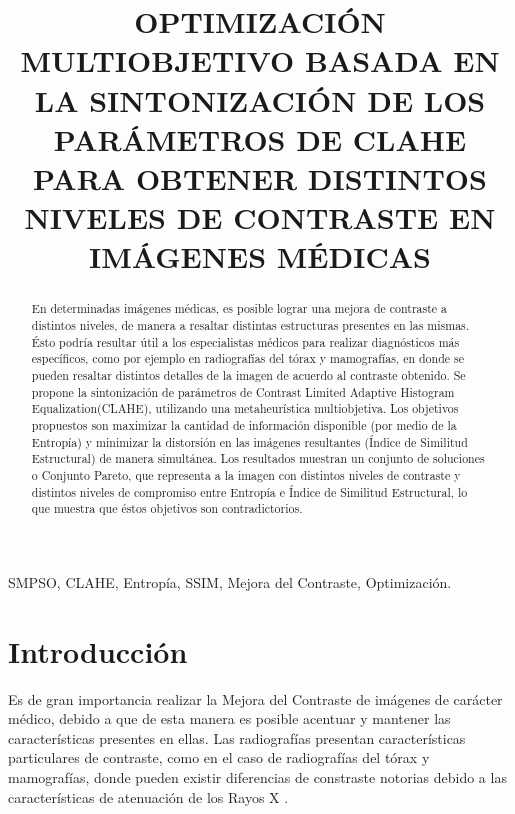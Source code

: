 \documentclass[spanish,twocolumn]{article}
\title{OPTIMIZACIÓN MULTIOBJETIVO BASADA EN LA SINTONIZACIÓN DE LOS PARÁMETROS DE CLAHE PARA OBTENER DISTINTOS NIVELES DE CONTRASTE EN IMÁGENES MÉDICAS}
\begin{document}
%
\maketitle
%
\begin{abstract}
En determinadas imágenes médicas, es posible lograr una mejora de contraste a distintos niveles, de manera a resaltar distintas estructuras presentes en las mismas. Ésto podría resultar útil a los especialistas médicos para realizar diagnósticos más específicos, como por ejemplo en radiografías del tórax y mamografías, en donde se pueden resaltar distintos detalles de la imagen de acuerdo al contraste obtenido. Se propone la sintonización de parámetros de Contrast Limited Adaptive Histogram Equalization(CLAHE), utilizando una metaheurística multiobjetiva. Los objetivos propuestos son maximizar la cantidad de información disponible (por medio de la Entropía) y minimizar la distorsión en las imágenes resultantes (Índice de Similitud Estructural) de manera simultánea. Los resultados muestran un conjunto de soluciones o Conjunto Pareto, que representa a la imagen con distintos niveles de contraste y distintos niveles de compromiso entre Entropía e Índice de Similitud Estructural, lo que muestra que éstos objetivos son contradictorios. 
\end{abstract}
%
\begin{keywords}
SMPSO, CLAHE, Entropía, SSIM, Mejora del Contraste, Optimización.
\end{keywords}
%
\section{Introducción}
\label{sec:intro}

Es de gran importancia realizar la Mejora del Contraste de imágenes de carácter médico, debido a que de esta manera es posible acentuar y mantener las características presentes en ellas. Las radiografías presentan características particulares de contraste, como en el caso de radiografías del tórax y mamografías, donde pueden existir diferencias de constraste notorias debido a las características de atenuación de los Rayos X \cite{chang1998image}.%
\end{document}
